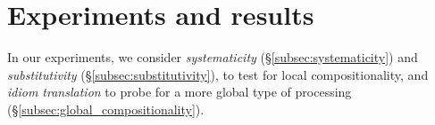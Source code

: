 \section{Experiments and results}
\label{sec:experiments}

In our experiments, we consider \emph{systematicity} (\S\ref{subsec:systematicity}) and \emph{substitutivity} (\S\ref{subsec:substitutivity}), to test for local compositionality, %
and \emph{idiom translation} %
to probe for a more global type of processing (\S\ref{subsec:global_compositionality}).

